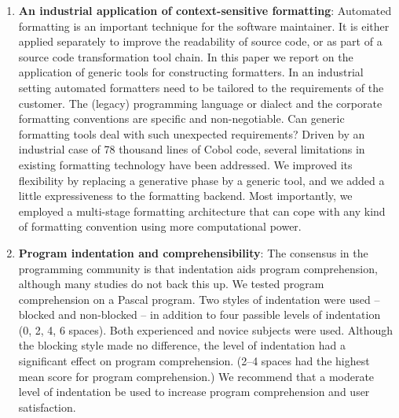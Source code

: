 \begin{englishtext}
\begin{enumerate}
    \item \textbf{An industrial application of context-sensitive formatting}:
    Automated formatting is an important technique for the software maintainer.
    It is either applied separately to improve the readability of source code,
    or as part of a source code transformation tool chain. In this paper we
    report on the application of generic tools for constructing formatters. In
    an industrial setting automated formatters need to be tailored to the
    requirements of the customer. The (legacy) programming language or dialect
    and the corporate formatting conventions are specific and non-negotiable.
    Can generic formatting tools deal with such unexpected requirements? Driven
    by an industrial case of 78 thousand lines of Cobol code, several
    limitations in existing formatting technology have been addressed. We
    improved its flexibility by replacing a generative phase by a generic tool,
    and we added a little expressiveness to the formatting backend. Most
    importantly, we employed a multi-stage formatting architecture that can cope
    with any kind of formatting convention using more computational power.
    \cite{industrialApplication}

    \item \textbf{Program indentation and comprehensibility}: The consensus in the
    programming community is that indentation aids program comprehension,
    although many studies do not back this up. We tested program comprehension
    on a Pascal program. Two styles of indentation were used -- blocked and
    non-blocked -- in addition to four passible levels of indentation
    (0, 2, 4, 6 spaces). Both experienced and novice subjects were used.
    Although the blocking style made no difference, the level of indentation had
    a significant effect on program comprehension. (2--4 spaces had the highest
    mean score for program comprehension.) We recommend that a moderate level
    of indentation be used to increase program comprehension and user
    satisfaction. \cite{programIndentation}


\end{enumerate}
\end{englishtext}
